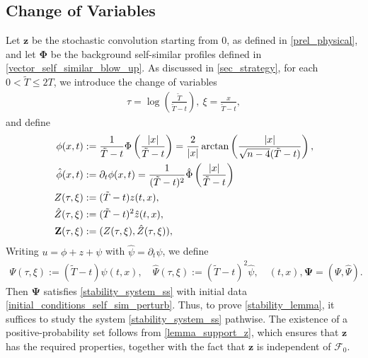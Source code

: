 \documentclass[12pt,reqno]{amsart}
\theoremstyle{plain}
\theoremstyle{remark}
\theoremstyle{plain}
\theoremstyle{definition}
\numberwithin{equation}{section}
\numberwithin{equation}{section}
\begin{document}
	\subsection{Change of Variables}\label{sec_change of variables}
	Let $\mathbf{z}$ be the stochastic convolution starting from $0$, as defined in \autoref{prel_physical}, and let $\mathbf{\Phi}$ be the background self-similar profiles defined in \eqref{vector_self_similar_blow_up}. As discussed in \autoref{sec_strategy}, for each $0<\tilde{T}\leq 2T$, we introduce the change of variables 
	\begin{align*}
		\tau=\log\left(\frac{\tilde{T}}{\tilde{T}-t}\right),\ \xi=\frac{x}{\tilde{T}-t},
	\end{align*}
	and define 
	\begin{align}\label{change_of_variables}
		\phi(x,t)&:=\frac{1}{\tilde{T}-t}\Phi\left(\frac{\lvert x\rvert}{\tilde{T}-t}\right)=\frac{2}{\lvert x\rvert}\operatorname{arctan}\left(\frac{\lvert x\rvert}{\sqrt{n-4}(\tilde{T}-t)}\right),\notag\\
		\hat{\phi}(x,t)&:=\partial_t \phi(x,t)=\frac{1}{(\tilde{T}-t)^2}\hat{\Phi}\left(\frac{\lvert x\rvert}{\tilde{T}-t}\right)\notag\\
		Z(\tau, \xi)&:=(\tilde{T}-t)z(t,x),\notag\\
		\hat{Z}(\tau, \xi)&:=(\tilde{T}-t)^2\hat{z}(t,x),\notag\\
		\mathbf{Z}(\tau,\xi)&:=(Z(\tau, \xi),\hat{Z}(\tau, \xi)),
	\end{align}    
	Writing $u = \phi + z + \psi$ with $\hat{\psi} = \partial_t \psi$, we define
	\begin{align*}
		\Psi(\tau,\xi):=(\tilde{T}-t)\psi(t,x),\quad \hat{\Psi}(\tau,\xi):=(\tilde{T}-t)^2\hat{\psi},\quad (t,x), \mathbf{\Psi}=(\Psi,\hat{\Psi}).
	\end{align*}
	Then $\mathbf{\Psi}$ satisfies \eqref{stability_system_ss} with initial data \eqref{initial_conditions_self_sim_perturb}.
	Thus, to prove \autoref{stability_lemma}, it suffices to study the system \eqref{stability_system_ss} pathwise. The existence of a positive-probability set follows from \autoref{lemma_support_z}, which ensures that $\mathbf{z}$ has the required properties, together with the fact that $\mathbf{z}$ is independent of $\mathcal{F}_0$.
    
\end{document}
